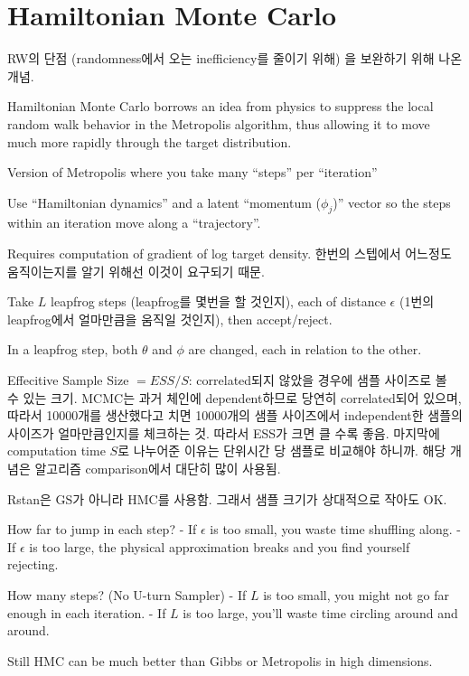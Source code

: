 \documentclass[
]{book}
\begin{document}
\hypertarget{hamiltonian-monte-carlo}{%
\section{Hamiltonian Monte Carlo}\label{hamiltonian-monte-carlo}}

RW의 단점 (randomness에서 오는 inefficiency를 줄이기 위해) 을 보완하기 위해 나온 개념.

Hamiltonian Monte Carlo borrows an idea from physics to suppress the local random walk behavior in the Metropolis algorithm, thus allowing it to move much more rapidly through the target distribution.

Version of Metropolis where you take many ``steps'' per ``iteration''

Use ``Hamiltonian dynamics'' and a latent ``momentum (\(\phi_j\))'' vector so the steps within an iteration move along a ``trajectory''.

Requires computation of gradient of log target density. 한번의 스텝에서 어느정도 움직이는지를 알기 위해선 이것이 요구되기 때문.

Take \(L\) leapfrog steps (leapfrog를 몇번을 할 것인지), each of distance \(\epsilon\) (1번의 leapfrog에서 얼마만큼을 움직일 것인지), then accept/reject.

In a leapfrog step, both \(\theta\) and \(\phi\) are changed, each in relation to the other.

Effecitive Sample Size \(=ESS/S\): correlated되지 않았을 경우에 샘플 사이즈로 볼 수 있는 크기. MCMC는 과거 체인에 dependent하므로 당연히 correlated되어 있으며, 따라서 10000개를 생산했다고 치면 10000개의 샘플 사이즈에서 independent한 샘플의 사이즈가 얼마만큼인지를 체크하는 것. 따라서 ESS가 크면 클 수록 좋음. 마지막에 computation time \(S\)로 나누어준 이유는 단위시간 당 샘플로 비교해야 하니까. 해당 개념은 알고리즘 comparison에서 대단히 많이 사용됨.

Rstan은 GS가 아니라 HMC를 사용함. 그래서 샘플 크기가 상대적으로 작아도 OK.

How far to jump in each step?
- If \(\epsilon\) is too small, you waste time shuffling along.
- If \(\epsilon\) is too large, the physical approximation breaks and you find yourself rejecting.

How many steps? (No U-turn Sampler)
- If \(L\) is too small, you might not go far enough in each iteration.
- If \(L\) is too large, you'll waste time circling around and around.

Still HMC can be much better than Gibbs or Metropolis in high dimensions.
\end{document}
